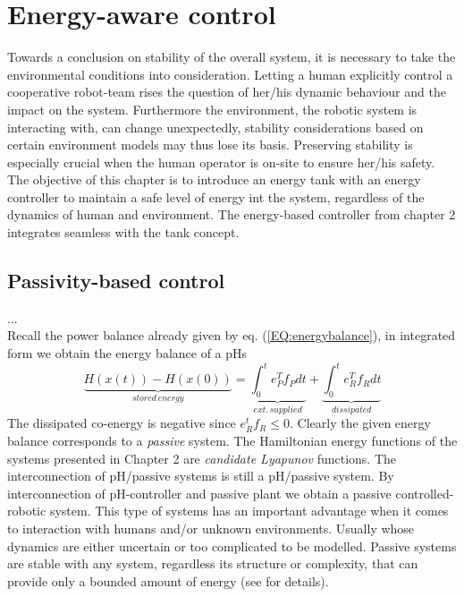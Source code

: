 \documentclass[a4paper,twoside, openright,12pt]{report}
\begin{document}
\chapter{Energy-aware control}
Towards a conclusion on stability of the overall system, it is necessary to take the environmental conditions into consideration. Letting a human explicitly control a cooperative robot-team rises the question of her/his dynamic behaviour and the impact on the system. Furthermore the environment, the robotic system is interacting with, can change unexpectedly, stability considerations based on certain environment models may thus lose its basis. Preserving stability is especially crucial when the human operator is on-site to ensure her/his safety. The objective of this chapter is to introduce an energy tank with an energy controller to maintain a safe level of energy int the system, regardless of the dynamics of human and environment. The energy-based controller from chapter 2 integrates seamless with the tank concept.
\section{Passivity-based control} 
...
\\   
Recall the power balance already given by eq. (\ref{EQ:energybalance}), in integrated form we obtain the energy balance of a pHs
\begin{equation}
\underbrace{H(x(t))-H(x(0))}_{stored\, energy} = \underbrace{\int_0^t e_P^Tf_P dt}_{ext.\, supplied} + \underbrace{\int_0^te_R^Tf_R dt}_{dissipated} 
\end{equation}
The dissipated co-energy is negative since $e_R^tf_R \leq 0$. Clearly the given energy balance corresponds to a \emph{passive} system. The Hamiltonian energy functions of the systems presented in Chapter 2 are \emph{candidate Lyapunov} functions. The interconnection of pH/passive systems is still a pH/passive system. By interconnection of pH-controller and passive plant we obtain a passive controlled-robotic system. This type of systems has an important advantage when it comes to interaction with humans and/or unknown environments. Usually whose dynamics are either uncertain or too complicated to be modelled. Passive systems are stable with any system, regardless its structure or complexity, that can provide only a bounded amount of energy (see \cite{Stramigioli_15} for details). \\
\end{document}
